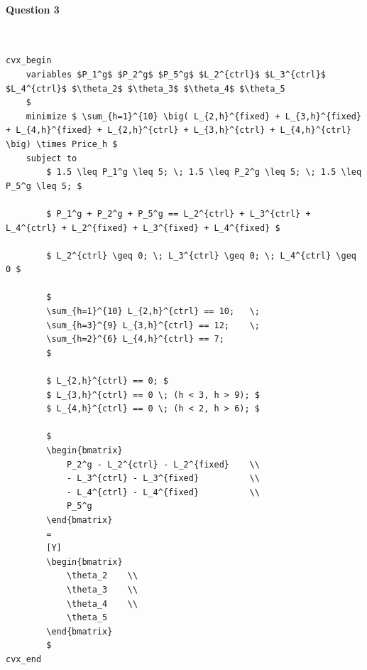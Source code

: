 \documentclass[11pt]{article}
\begin{document}
\paragraph{Question 3} \mbox{} \\
\begin{lstlisting}
cvx_begin
    variables $P_1^g$ $P_2^g$ $P_5^g$ $L_2^{ctrl}$ $L_3^{ctrl}$ $L_4^{ctrl}$ $\theta_2$ $\theta_3$ $\theta_4$ $\theta_5
    $
    minimize $ \sum_{h=1}^{10} \big( L_{2,h}^{fixed} + L_{3,h}^{fixed} + L_{4,h}^{fixed} + L_{2,h}^{ctrl} + L_{3,h}^{ctrl} + L_{4,h}^{ctrl} \big) \times Price_h $
    subject to
        $ 1.5 \leq P_1^g \leq 5; \; 1.5 \leq P_2^g \leq 5; \; 1.5 \leq P_5^g \leq 5; $
        
        $ P_1^g + P_2^g + P_5^g == L_2^{ctrl} + L_3^{ctrl} + L_4^{ctrl} + L_2^{fixed} + L_3^{fixed} + L_4^{fixed} $

        $ L_2^{ctrl} \geq 0; \; L_3^{ctrl} \geq 0; \; L_4^{ctrl} \geq 0 $

        $
        \sum_{h=1}^{10} L_{2,h}^{ctrl} == 10;   \;
        \sum_{h=3}^{9} L_{3,h}^{ctrl} == 12;    \;
        \sum_{h=2}^{6} L_{4,h}^{ctrl} == 7;
        $

        $ L_{2,h}^{ctrl} == 0; $
        $ L_{3,h}^{ctrl} == 0 \; (h < 3, h > 9); $
        $ L_{4,h}^{ctrl} == 0 \; (h < 2, h > 6); $
        
        $
        \begin{bmatrix}
            P_2^g - L_2^{ctrl} - L_2^{fixed}    \\
            - L_3^{ctrl} - L_3^{fixed}          \\
            - L_4^{ctrl} - L_4^{fixed}          \\
            P_5^g                       
        \end{bmatrix}
        =
        [Y]
        \begin{bmatrix}
            \theta_2    \\
            \theta_3    \\
            \theta_4    \\
            \theta_5
        \end{bmatrix}
        $
cvx_end
\end{lstlisting}
\end{document}

